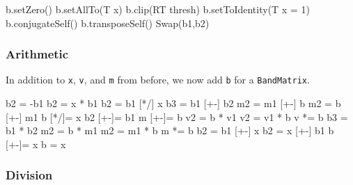 \documentclass[twoside,letterpaper,11pt]{article}
\renewcommand{\tt}[1]{{\lstinline {#1}}}
\begin{document}
\begin{tmvcode}
b.setZero()
b.setAllTo(T x)
b.clip(RT thresh)
b.setToIdentity(T x = 1)
b.conjugateSelf()
b.transposeSelf()
Swap(b1,b2)
\end{tmvcode}
\vspace{12pt}

\subsubsection{Arithmetic}

In addition to \tt{x}, \tt{v}, and \tt{m} from before, we now add \tt{b} 
for a \tt{BandMatrix}.

\begin{tmvcode}
b2 = -b1
b2 = x * b1
b2 = b1 [*/] x
b3 = b1 [+-] b2
m2 = m1 [+-] b
m2 = b [+-] m1
b [*/]= x
b2 [+-]= b1
m [+-]= b
v2 = b * v1
v2 = v1 * b
v *= b
b3 = b1 * b2
m2 = b * m1
m2 = m1 * b
m *= b
b2 = b1 [+-] x
b2 = x [+-] b1
b [+-]= x
b = x
\end{tmvcode}

\subsubsection{Division}
\end{document}
